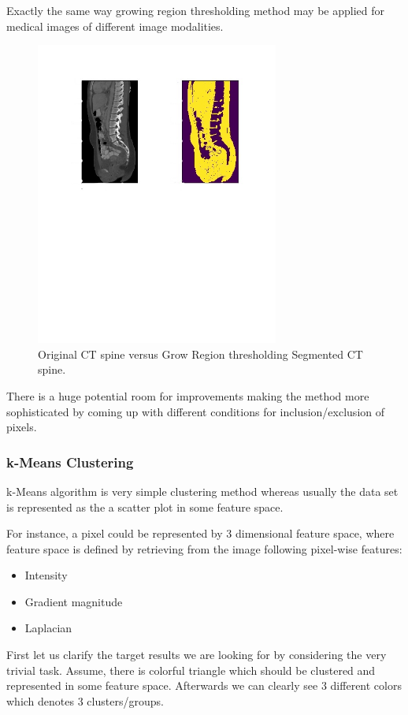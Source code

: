 Exactly the same way growing region thresholding method may be applied for medical images of different image modalities.
\begin{figure}[h]
    \centering \includegraphics[width=8cm]{images/ct-spine-grow-region-segmented.jpg}
    \vspace*{-50mm} \caption {Original CT spine versus Grow Region thresholding Segmented CT spine.}
\end{figure}    

There is a huge potential room for improvements making the method more sophisticated by coming up with different conditions for inclusion/exclusion of pixels.

\subsubsection{k-Means Clustering}
k-Means algorithm is very simple clustering method whereas usually the data set is represented as the a scatter plot in some feature space.

For instance, a pixel could be represented by 3 dimensional feature space, where feature space is defined by retrieving from the image following pixel-wise features:
\begin{itemize}
    \item Intensity
    \item Gradient magnitude
    \item Laplacian
\end{itemize}

First let us clarify the target results we are looking for by considering the very trivial task.
Assume, there is colorful triangle which should be clustered and represented in some feature space. Afterwards we can clearly see 3 different colors which denotes 3 clusters/groups.

